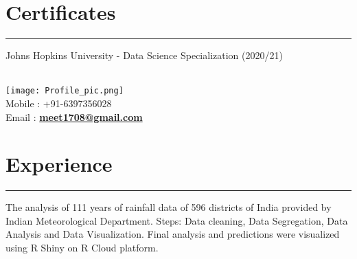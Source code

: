 \documentclass[]{meetresume-class}
\begin{document}
\begin{minipage}[t]{0.33\textwidth}
		\section{Certificates}
		\noindent\rule{5cm}{0.6pt}
		
		Johns Hopkins University - Data Science Specialization (2020/21)\\
		
	\end{minipage} 
	\hfill
	\begin{minipage}[t]{0.66\textwidth} 
		\hspace*{0pt}\hfill    \\
		\hspace*{0pt}\hfill \texttt{[image: Profile\_pic.png]}\\
		\hspace*{0pt}\hfill Mobile : +91-6397356028 \\
		\hspace*{0pt}\hfill Email : \textbf{\href{mailto:meet1708@gmail.com}{meet1708@gmail.com}}
		\section{Experience}
		\noindent\rule{12.5cm}{0.4pt}
		 
		\noindent
		\hspace{7em}%
		\begin{minipage}{0.76\textwidth\vspace{2pt}}
			The analysis of 111 years of rainfall data of 596 districts of India provided by Indian Meteorological Department. Steps: Data cleaning, Data Segregation, Data Analysis and Data Visualization.  Final analysis and predictions were visualized using R Shiny on R Cloud platform.
		\end{minipage}
		\sectionsep
		

\end{minipage}
\end{document}
